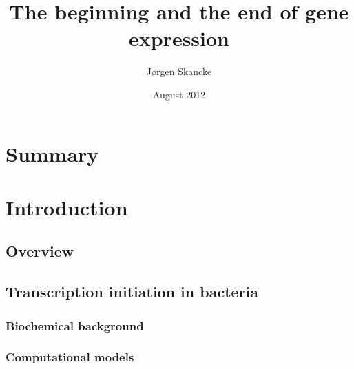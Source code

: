 \documentclass[]{ntnuthesis}
\title{The beginning and the end of gene expression}
\author{Jørgen Skancke}
\date{August 2012}
\begin{document}
 

\frontmatter

\maketitle

\chapter*{Summary}
\noindent
    
\clearpage


%


\mainmatter
\chapter{Introduction}
\begin{refsection}
\section{Overview}

\FloatBarrier


\section{Transcription initiation in bacteria}

\subsection{Biochemical background}

\subsection{Computational models}

\printbibliography
\end{refsection}
\newpage
\end{document}
